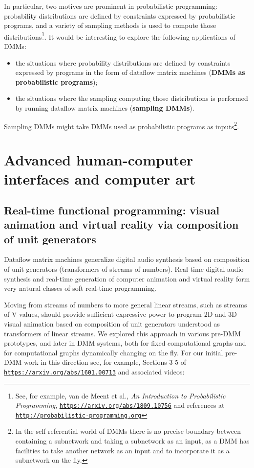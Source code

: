 \documentclass{article}
\begin{document}
In particular, two motives are prominent in probabilistic programming: probability distributions are defined
by constraints expressed by probabilistic programs, and a variety of sampling methods is used
to compute those distributions\footnote{See, for example, van  de Meent et al., {\em An Introduction to Probabilistic Programming}, 
\href{https://arxiv.org/abs/1809.10756}{\tt https://arxiv.org/abs/1809.10756} and references at \href{http://probabilistic-programming.org}{\tt http://probabilistic-programming.org} }.
It would be interesting to explore the following applications of DMMs:
  \begin{itemize}
      \item the situations where probability distributions are defined by
constraints expressed by programs in the form of dataflow matrix machines ({\bf DMMs as probabilistic programs});
     \item the situations where the sampling
computing those distributions is performed by running dataflow matrix machines ({\bf sampling DMMs}).
  \end{itemize}
Sampling DMMs might take  DMMs  used as probabilistic programs as inputs\footnote{In 
the self-referential world of DMMs there is no precise boundary between containing a subnetwork and taking a subnetwork as an input, as a DMM has facilities
to take another network as an input and to incorporate it as a subnetwork on the fly.}.

\section{Advanced human-computer interfaces and computer art}

\subsection{Real-time functional programming: visual animation and virtual reality via composition
of unit generators}

Dataflow matrix machines generalize digital audio synthesis based on composition of unit generators
(transformers of streams of numbers). Real-time digital audio synthesis and real-time generation
of computer animation and virtual reality form very natural classes of soft real-time programming.

Moving from streams of numbers to more general linear streams, such as streams of V-values,
should provide sufficient expressive power to program 2D and 3D visual animation based on
composition of unit generators understood as transformers of linear streams. We explored
this approach in various pre-DMM prototypes, and later in DMM systems, both for fixed
computational graphs and for computational graphs dynamically changing on the fly.
For our initial pre-DMM work in this direction see, for example, Sections 3-5 of \href{https://arxiv.org/abs/1601.00713}{\tt https://arxiv.org/abs/1601.00713} and associated videos:
\end{document}
